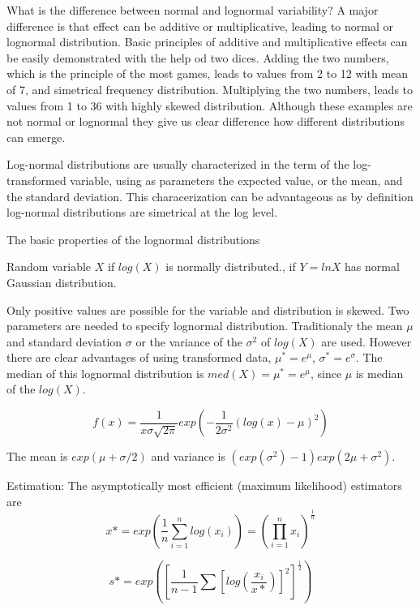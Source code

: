 What is the difference between normal and lognormal variability? A major difference is that effect can be additive or multiplicative, leading to normal or lognormal distribution. Basic principles of additive and multiplicative effects can be easily demonstrated with the help od two dices. Adding the two numbers, which is the principle of the most games, leads to values from 2 to 12 with mean of 7, and simetrical frequency distribution. Multiplying the two numbers, leads to values from 1 to 36 with highly skewed distribution. Although these examples are not normal or lognormal they give us clear difference how different distributions can emerge. 

Log-normal distributions are usually characterized in the term of the log-transformed variable, using as parameters the expected value, or the mean, and the standard deviation. This characerization can be advantageous as by definition log-normal distributions are simetrical at the log level. 

The basic properties of the lognormal distributions

Random variable $X$ if $log(X)$ is normally distributed., if $Y=ln X$ has normal Gaussian distribution.  

Only positive values are possible for the variable and distribution is skewed. Two parameters are needed to specify lognormal distribution. Traditionaly the mean $\mu$ and standard deviation $\sigma$ or the variance of the $\sigma^2$ of $log(X)$ are used. However there are clear advantages of using transformed data, $\mu^{*} = e^{\mu}$, $\sigma^{*}= e ^{\sigma}$. The median of this lognormal distribution is $med(X)=\mu^{*}=e^{\mu}$, since $\mu$ is median of the $log(X)$.

\begin{equation}
f(x) = \frac{1}{x \sigma \sqrt{2\pi}}exp(-\frac{1}{2\sigma^2}(log(x)-\mu)^2)
\end{equation}

The mean is $exp(\mu + \sigma /2)$ and variance is $(exp(\sigma^2)-1)exp(2\mu+\sigma^2)$. 

Estimation: The asymptotically most efficient (maximum likelihood) estimators are 
\begin{equation}
x* = exp (\frac{1}{n}\sum_{i=1}^n log(x_i)) = (\prod_{i=1}^nx_i)^{\frac{1}{n}}
\end{equation}

\begin{equation}
s* = exp([\frac{1}{n-1}\sum[log(\frac{x_i}{x*})]^2]^{\frac{1}{2}})
\end{equation}


